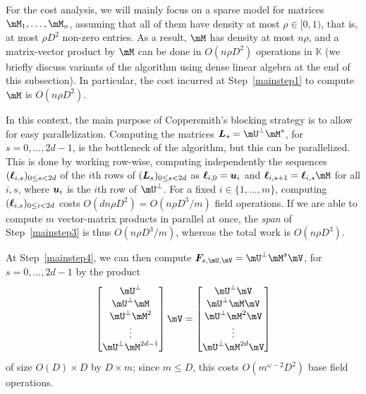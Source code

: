 \documentclass[12pt]{article}
\newcommand{\mat}[1]{\bm{\MakeUppercase{#1}}} %
\newcommand{\row}[1]{\bm{\MakeLowercase{#1}}} %
\newcommand{\seqelt}[1]{\bm{F}_{#1}} %
\newcommand{\density}{\rho}
\def\K{\mathbb{K}}
\def\K {\ensuremath{\mathbb{K}}}
\begin{document}
For the cost analysis, we will mainly focus on a sparse model for
matrices $\mM_1,\dots,\mM_n$, assuming that all of them have density
at most $\density \in [0,1)$, that is, at most $\density D^2$ non-zero
  entries.  As a result, $\mM$ has density at most $n\density$, and a
  matrix-vector product by $\mM$ can be done in $O(n\density D^2)$
  operations in $\K$ (we briefly discuss variants of the algorithm
  using dense linear algebra at the end of this subsection). In
  particular, the cost incurred at Step~\ref{mainstep1} to compute
  $\mM$ is $O(n\density D^2)$.

In this context, the main purpose of Coppersmith's blocking strategy
is to allow for easy parallelization. Computing the matrices
$\mat{L}_s=\mU^{\perp}\mM^s$, for $s=0,\dots,2d-1$, is the bottleneck
of the algorithm, but this can be parallelized. This is done by
working row-wise, computing independently the sequences
$(\row{\ell}_{i,s})_{0 \le s < 2d}$ of the $i$th rows of
$(\mat{L}_s)_{0 \le s < 2d}$ as $\row{\ell}_{i,0}=\row{u}_i$ and
 $\row{\ell}_{i,s+1} = \row{\ell}_{i,s}
\mM$ for all $i,s$, where $\row{u}_i$ is the $i$th row of $\mU^\perp$.
For a fixed $i \in \{1,\dots,m\}$, computing $(\mat{\ell}_{i,s})_{0
  \le i < 2d}$ costs $O(dn \density D^2) = O(n\density D^3/m )$ field operations. If
we are able to compute $m$ vector-matrix products in parallel at once,
the {\em span} of Step~\ref{mainstep3} is thus $O(n\density D^3/m)$, whereas
the total work is $O(n\density D^3)$.

At Step~\ref{mainstep4}, we can then compute $\seqelt{s,\mU,\mV}=\mU^{\perp}\mM^s\mV$, for $s=0,\dots,2d-1$ by the
product
$$
\begin{bmatrix}
\mU^{\perp}\\
\mU^{\perp} \mM\\
\mU^{\perp} \mM^2\\
\vdots\\
\mU^{\perp} \mM^{2d-1}\\
\end{bmatrix} \mV
= 
\begin{bmatrix}
\mU^{\perp} \mV\\
\mU^{\perp} \mM \mV\\
\mU^{\perp} \mM^2 \mV\\
\vdots \\
\mU^{\perp} \mM^{2d} \mV\\
\end{bmatrix}
$$
of size $O(D) \times D$ by $D \times m$; since $m \le D$, this  costs $O(m^{\omega-2}D^2)$
base field operations.
\end{document}
